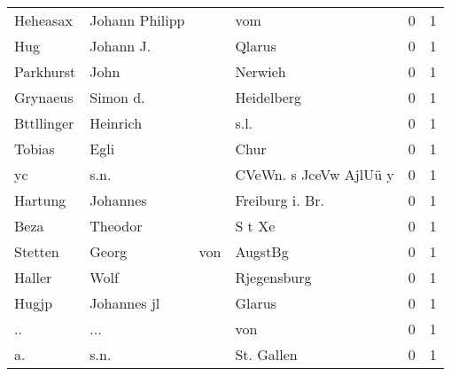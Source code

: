 \documentclass[10pt,a4paper,landscape]{article}
\begin{document}
\begin{longtable}{llllrr}
                 Heheasax &                     Johann Philipp &             &                                         vom &          0 &         1 \\
                      Hug &                          Johann J. &             &                                      Qlarus &          0 &         1 \\
                Parkhurst &                               John &             &                                     Nerwieh &          0 &         1 \\
                 Grynaeus &                           Simon d. &             &                                  Heidelberg &          0 &         1 \\
               Bttllinger &                           Heinrich &             &                                        s.l. &          0 &         1 \\
                   Tobias &                               Egli &             &                                        Chur &          0 &         1 \\
                       yc &                               s.n. &             &                      CVeWn. s JceVw AjlUü y &          0 &         1 \\
                  Hartung &                           Johannes &             &                            Freiburg i. Br.  &          0 &         1 \\
                     Beza &                            Theodor &             &                                      S t Xe &          0 &         1 \\
                  Stetten &                              Georg &         von &                                     AugstBg &          0 &         1 \\
                   Haller &                               Wolf &             &                                 Rjegensburg &          0 &         1 \\
                    Hugjp &                        Johannes jl &             &                                      Glarus &          0 &         1 \\
                       .. &                                ... &             &                                         von &          0 &         1 \\
                       a. &                               s.n. &             &                                  St. Gallen &          0 &         1 \\

\end{longtable}
\end{document}
